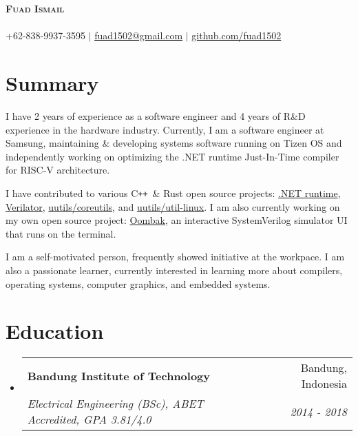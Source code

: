 \documentclass[letterpaper,11pt]{article}
\makeatletter
\newcommand{\resumeSubheading}[4]{
  \vspace{-2pt}\item
    \begin{tabular*}{0.97\textwidth}[t]{l@{\extracolsep{\fill}}r}
      \textbf{#1} & #2 \\
      \textit{\small#3} & \textit{\small #4} \\
    \end{tabular*}\vspace{-7pt}
}
\newcommand{\resumeSubHeadingListStart}{\begin{itemize}[leftmargin=0.15in, label={}]}
\newcommand{\resumeSubHeadingListEnd}{\end{itemize}}
\newcommand{\githubPRs}[2]{\href{https://github.com/#1/pulls?q=is\%3Apr+author\%3Afuad1502}{#2}}
\newcommand\CC{C\texttt{++}}
\makeatother
\begin{document}
\begin{center}
	\textbf{\Huge \scshape Fuad Ismail} \\
	\vspace{1pt} \small \textit{} \\
	+62-838-9937-3595 $|$ \href{mailto:fuad1502@gmail.com}{fuad1502@gmail.com} $|$ \href{https://github.com/fuad1502}{github.com/fuad1502}
\end{center}

\section*{Summary}
\justifying

I have 2 years of experience as a software engineer and 4 years of R\&D
experience in the hardware industry. Currently, I am a software engineer at
Samsung, maintaining \& developing systems software running on Tizen OS and
independently working on optimizing the .NET runtime Just-In-Time compiler for
RISC-V architecture.

I have contributed to various \CC\ \& Rust open source projects:
\githubPRs{dotnet/runtime}{.NET runtime},
\githubPRs{verilator/verilator}{Verilator},
\githubPRs{uutils/coreutils}{uutils/coreutils}, and
\githubPRs{uutils/util-linux}{uutils/util-linux}. I am also currently working
on my own open source project:
\href{https://github.com/fuad1502/oombak}{Oombak}, an interactive SystemVerilog
simulator UI that runs on the terminal.

I am a self-motivated person, frequently showed initiative at the workpace. I
am also a passionate learner, currently interested in learning more about
compilers, operating systems, computer graphics, and embedded systems.

\section{Education}
\resumeSubHeadingListStart
\resumeSubheading
{Bandung Institute of Technology}{Bandung, Indonesia}
{Electrical Engineering (BSc), ABET Accredited, GPA 3.81/4.0}{2014 - 2018}
\resumeSubHeadingListEnd

\end{document}

